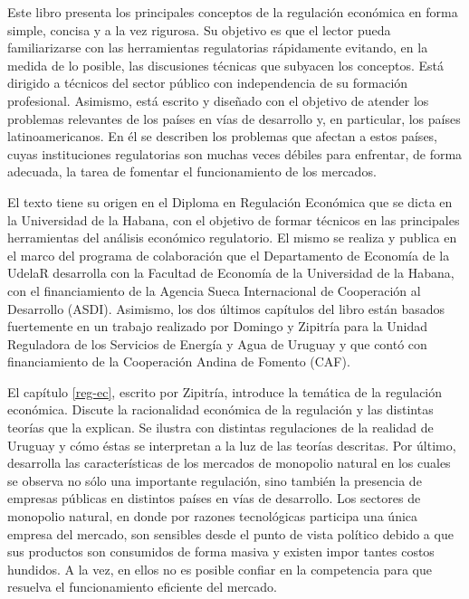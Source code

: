 \documentclass[
  12pt,
  spanish,
]{book}
\begin{document}
Este libro presenta los principales conceptos de la regulación económica en forma simple, concisa y a la vez rigurosa. Su objetivo es que el lector pueda familiarizarse con las herramientas regulatorias rápidamente evitando, en la medida de lo posible, las discusiones técnicas que subyacen los conceptos. Está dirigido a técnicos del sector público con independencia de su formación profesional. Asimismo, está escrito y diseñado con el objetivo de atender los problemas relevantes de los países en vías de desarrollo y, en particular, los países latinoamericanos. En él se describen los problemas que afectan a estos países, cuyas instituciones regulatorias son muchas veces débiles para enfrentar, de forma adecuada, la tarea de fomentar el funcionamiento de los mercados.

El texto tiene su origen en el Diploma en Regulación Económica que se dicta en la Universidad de la Habana, con el objetivo de formar técnicos en las principales herramientas del análisis económico regulatorio. El mismo se realiza y publica en el marco del programa de colaboración que el Departamento de Economía de la UdelaR desarrolla con la Facultad de Economía de la Universidad de la Habana, con el financiamiento de la Agencia Sueca Internacional de Cooperación al Desarrollo (ASDI). Asimismo, los dos últimos capítulos del libro están basados fuertemente en un trabajo realizado por Domingo y Zipitría para la Unidad Reguladora de los Servicios de Energía y Agua de Uruguay y que contó con financiamiento de la Cooperación Andina de Fomento (CAF).

El capítulo \ref{reg-ec}, escrito por Zipitría, introduce la temática de la regulación económica. Discute la racionalidad económica de la regulación y las distintas teorías que la explican. Se ilustra con distintas regulaciones de la realidad de Uruguay y cómo éstas se interpretan a la luz de las teorías descritas. Por último, desarrolla las características de los mercados de monopolio natural en los cuales se observa no sólo una importante regulación, sino también la presencia de empresas públicas en distintos países en vías de desarrollo. Los sectores de monopolio natural, en donde por razones tecnológicas participa una única empresa del mercado, son sensibles desde el punto de vista político debido a que sus productos son consumidos de forma masiva y existen impor tantes costos hundidos. A la vez, en ellos no es posible confiar en la competencia para que resuelva el funcionamiento eficiente del mercado.
\end{document}

